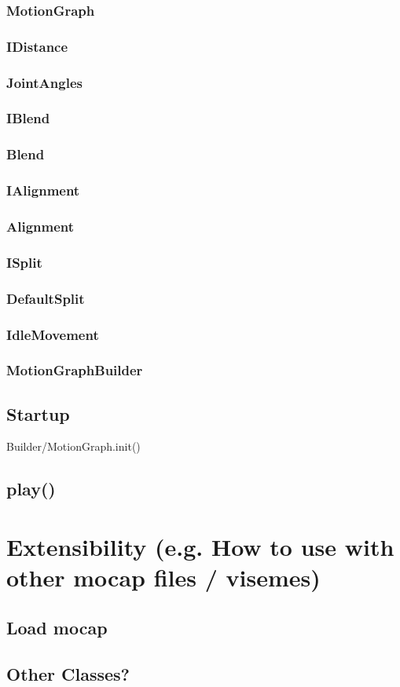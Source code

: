 \documentclass[a4paper,10pt]{scrartcl}
\let\stdsubsection\subsection
\renewcommand\subsection{\nopagebreak\stdsubsection}
\begin{document}
\subsubsection{MotionGraph}
\subsubsection{IDistance}
\subsubsection{JointAngles}
\subsubsection{IBlend}
\subsubsection{Blend}
\subsubsection{IAlignment}
\subsubsection{Alignment}
\subsubsection{ISplit}
\subsubsection{DefaultSplit}
\subsubsection{IdleMovement}
\subsubsection{MotionGraphBuilder}


\subsection{Startup}
Builder/MotionGraph.init()

\subsection{play()}

\section{Extensibility (e.g. How to use with other mocap files / visemes)}

\subsection{Load mocap}

\subsection{Other Classes?}

%
\end{document}
